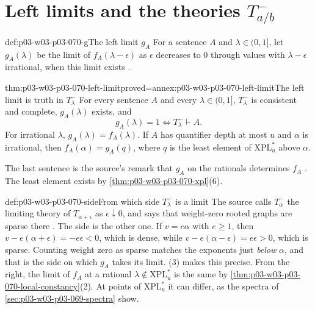 \section{Left limits and the theories \texorpdfstring{\(T^-_{a/b}\)}{T-minus a/b}}
\label{sec:p03-w03-p03-070-left-limits}

\begin{hbdefinition}{def:p03-w03-p03-070-g}{The left limit \(g_A\)}
For a sentence \(A\) and \(\lambda\in(0,1]\), let \(g_A(\lambda)\) be the
limit of \(f_A(\lambda-\epsilon)\) as \(\epsilon\) decreases to \(0\) through
values with \(\lambda-\epsilon\) irrational, when this limit exists
\cite[p.~19]{Spencer2007LogicRandomStructuresAuthor}.
\end{hbdefinition}

\begin{hbtheorem}{thm:p03-w03-p03-070-left-limit}{proved=annex:p03-w03-p03-070-left-limit}{The left limit is truth in \(T^-_\lambda\)}
For every sentence \(A\) and every \(\lambda\in(0,1]\), \(T^-_\lambda\) is
consistent and complete, \(g_A(\lambda)\) exists, and
\[
  g_A(\lambda)=1\iff T^-_\lambda\vdash A .
\]
For irrational \(\lambda\), \(g_A(\lambda)=f_A(\lambda)\).  If \(A\) has
quantifier depth at most \(u\) and \(\alpha\) is irrational, then
\(f_A(\alpha)=g_A(q)\), where \(q\) is the least element of
\(\mathrm{XPL}^\ast_u\) above \(\alpha\).
\end{hbtheorem}

The last sentence is the source's remark that \(g_A\) on the rationals
determines \(f_A\) \cite[p.~19]{Spencer2007LogicRandomStructuresAuthor}.  The
least element exists by \cref{thm:p03-w03-p03-070-xpl}(6).

\begin{hbwarning}{def:p03-w03-p03-070-side}{From which side \(T^-_\lambda\) is a limit}
The source calls \(T^-_\alpha\) the limiting theory of \(T_{\alpha+\epsilon}\)
as \(\epsilon\downarrow0\), and says that weight-zero rooted graphs are sparse
there \cite[p.~19]{Spencer2007LogicRandomStructuresAuthor}.  The side is the
other one.  If \(v=e\alpha\) with \(e\geq1\), then
\(v-e(\alpha+\epsilon)=-e\epsilon<0\), which is dense, while
\(v-e(\alpha-\epsilon)=e\epsilon>0\), which is sparse.  Counting weight zero
as sparse matches the exponents just \emph{below} \(\alpha\), and that is the
side on which \(g_A\) takes its limit.  (3)
makes this precise.  From the right, the limit of \(f_A\) at a rational
\(\lambda\notin\mathrm{XPL}^\ast_u\) is the same by
\cref{thm:p03-w03-p03-070-local-constancy}(2).  At points of
\(\mathrm{XPL}^\ast_u\) it can differ, as the spectra of
\cref{sec:p03-w03-p03-069-spectra} show.
\end{hbwarning}

